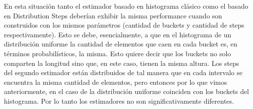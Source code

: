 En esta situación tanto el estimador basado en histograma clásico como el basado en Distribution Steps deberían exhibir la misma performance cuando son construidos con los mismos parámetros (cantidad de buckets y cantidad de steps respectivamente). Esto se debe, esencialmente, a que en el histograma de un distribución uniforme la cantidad de elementos que caen en cada bucket es, en términos probabilísticos, la misma. Esto quiere decir que los buckets no solo comparten la longitud sino que, en este caso, tienen la misma altura. Los steps del segundo estimador están distribuidos de tal manera que en cada intervalo se encuentra la misma cantidad de elementos, pero entonces por lo que vimos anteriormente, en el caso de la distribución uniforme coinciden con los buckets del histograma. Por lo tanto los estimadores no son significativamente diferentes.


